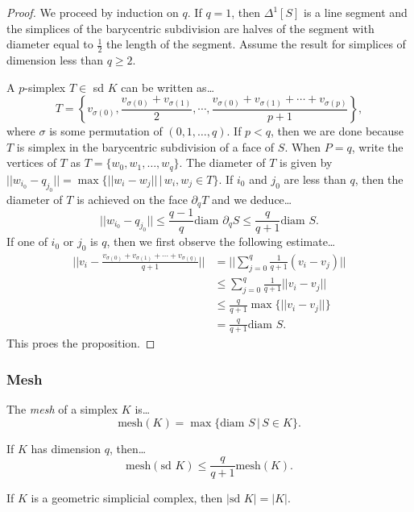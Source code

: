 \begin{proof}
We proceed by induction on $q$. If $q = 1$, then $\Delta^1[S]$ is a line segment and the simplices of the barycentric subdivision are halves of the segment
with diameter equal to $\frac{1}{2}$ the length of the segment. Assume the result for simplices of dimension less than $q \geq 2$.

A $p$-simplex $T \in $ sd $K$ can be written as\dots
$$T = \left\{ v_{\sigma(0)}, \frac{v_{\sigma(0)} + v_{\sigma(1)}}{2}, \cdots, \frac{v_{\sigma(0)} + v_{\sigma(1)} + \cdots + v_{\sigma(p)}}{p+1} \right\},$$
where $\sigma$ is some permutation of $(0,1,\dots,q)$. If $p < q$, then we are done because $T$ is simplex in the barycentric subdivision of a face of $S$. When
$P = q$, write the vertices of $T$ as $T = \{ w_0, w_1, \dots, w_q \}$. The diameter of $T$ is given by $|| w_{i_0} - q_{j_0}|| = \max \{ ||w_i - w_j || \, | \, w_i,w_j \in T \}.$
If $i_0$ and $j_0$ are less than $q$, then the diameter of $T$ is achieved on the face $\partial_q T$ and we deduce\dots
$$|| w_{i_0} - q_{j_0}|| \leq \frac{q-1}{q}\textrm{diam }\partial_q S \leq \frac{q}{q+1} \textrm{diam } S.$$
If one of $i_0$ or $j_0$ is $q$, then we first observe the following estimate\dots
\begin{align*}
||v_i - \frac{v_{\sigma(0)} + v_{\sigma(1)} + \cdots + v_{\sigma(q)}}{q+1}|| &= ||\sum^q_{j=0}\frac{1}{q+1}(v_i - v_j)||\\
																			 &\leq \sum^q_{j=0}\frac{1}{q+1}||v_i - v_j||\\
																			 &\leq \frac{q}{q+1}\max\{ ||v_i - v_j || \}\\
																			 &= \frac{q}{q+1} \textrm{diam } S.
\end{align*}
This proes the proposition.
\end{proof}

\subsubsection{Mesh}\label{mesh}
The \emph{mesh} of a simplex $K$ is\dots
$$\textrm{mesh}(K) = \max\{ \textrm{diam } S \, | \, S \in K \}.$$

\begin{corollary}
If $K$ has dimension $q$, then\dots
$$\textrm{mesh}(\textrm{sd }K) \leq \frac{q}{q+1}\textrm{mesh}(K).$$
\end{corollary}

\begin{theorem}
If $K$ is a geometric simplicial complex, then $|\textrm{sd } K| = |K|.$
\end{theorem}

